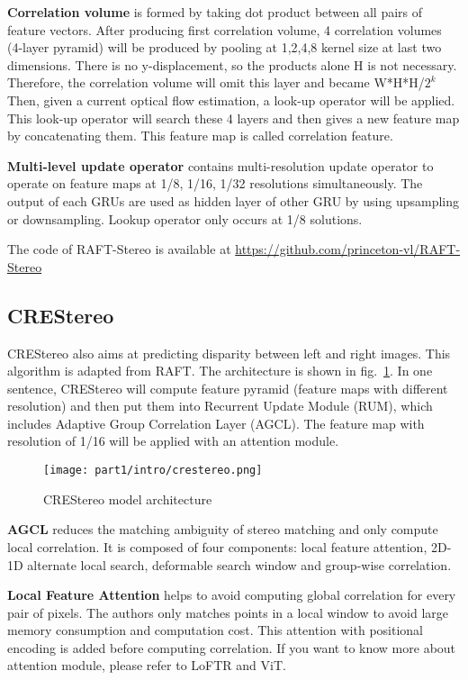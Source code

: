 \documentclass[12pt]{article}
\begin{document}
\textbf{Correlation volume} is formed by taking dot product between all pairs of feature vectors. After producing first correlation volume, 4 correlation volumes (4-layer pyramid) will be produced by pooling at {1,2,4,8} kernel size at last two dimensions. There is no y-displacement, so the products alone H is not necessary. Therefore, the correlation volume will omit this layer and became W*H*H/$2^k$ Then, given a current optical flow estimation, a look-up operator will be applied. This look-up operator will search these 4 layers and then gives a new feature map by concatenating them. This feature map is called correlation feature.

\textbf{Multi-level update operator} contains multi-resolution update operator to operate on feature maps at 1/8, 1/16, 1/32 resolutions simultaneously. The output of each GRUs are used as hidden layer of other GRU by using upsampling or downsampling. Lookup operator only occurs at 1/8 solutions.

The code of RAFT-Stereo is available at \url{https://github.com/princeton-vl/RAFT-Stereo}

\subsection{CREStereo\cite{crestereo}}
CREStereo also aims at predicting disparity between left and right images. This algorithm is adapted from RAFT. The architecture is shown in fig.~\ref{crestereo}. In one sentence, CREStereo will compute feature pyramid (feature maps with different resolution) and then put them into Recurrent Update Module (RUM), which includes Adaptive Group Correlation Layer (AGCL). The feature map with resolution of 1/16 will be applied with an attention module.
\begin{figure}[H]
    \centering
    \texttt{[image: part1/intro/crestereo.png]}
    \caption{CREStereo model architecture}
    \label{crestereo}
\end{figure}

\textbf{AGCL} reduces the matching ambiguity of stereo matching and only compute local correlation. It is composed of four components: local feature attention, 2D-1D alternate local search, deformable search window and group-wise correlation.

\textbf{Local Feature Attention} helps to avoid computing global correlation for every pair of pixels. The authors only matches points in a local window to avoid large memory consumption and computation cost. This attention with positional encoding is added before computing correlation. If you want to know more about attention module, please refer to LoFTR\cite{loftr} and ViT\cite{vit}.
\end{document}
